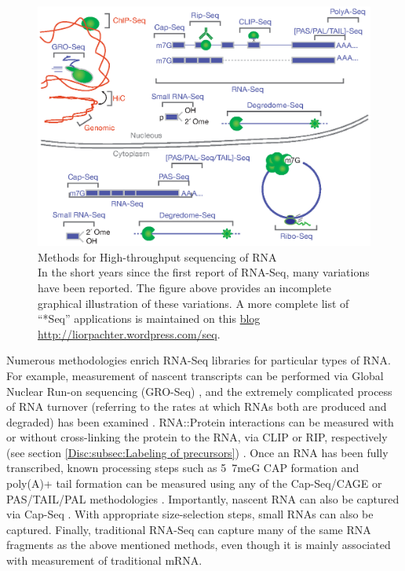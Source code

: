     \begin{figure} %
      \centering 
      \includegraphics{Figures/Intro/RNA_Sequencing_methodologies.eps}
      \caption[Methods for High-throughput sequencing of RNA]
      {
      Methods for High-throughput sequencing of RNA\\[0.25cm]
      In the short years since the first report of RNA-Seq, many variations have been reported. The figure above provides an incomplete graphical illustration of these variations. A more complete list of ``*Seq'' applications is maintained on this \href{http://liorpachter.wordpress.com/seq/}{blog} \url{http://liorpachter.wordpress.com/seq}.
      }
      \label{Intro:fig:htsMethods}
      \end{figure}

    Numerous methodologies enrich RNA-Seq libraries for particular types of RNA. For example, measurement of nascent transcripts can be performed via Global Nuclear Run-on sequencing (GRO-Seq) \citep{Core2008a}, and the extremely complicated process of RNA turnover (referring to the rates at which RNAs both are produced and degraded) has been examined \citep{Ghosh2010a, Tani2012}. RNA::Protein interactions can be measured with or without cross-linking the protein to the RNA, via CLIP or RIP, respectively (see section \ref{Disc:subsec:Labeling of precursors}) \citep{Ule2005,Licatalosi2006,Singh2013}. Once an RNA has been fully transcribed, known processing steps such as 5\textprime~7meG CAP formation and poly(A)+ tail formation can be measured using any of the Cap-Seq/CAGE \citep{Shiraki2003a} or PAS/TAIL/PAL methodologies \citep{Shepard2011, Chang2014b, Subtelny2014}. Importantly, nascent RNA can also be captured via Cap-Seq \citep{Kruesi2013}. With appropriate size-selection steps, small RNAs \citep{Ghildiyal2008} can also be captured. Finally, traditional RNA-Seq can capture many of the same RNA fragments as the above mentioned methods, even though it is mainly associated with measurement of traditional mRNA.


